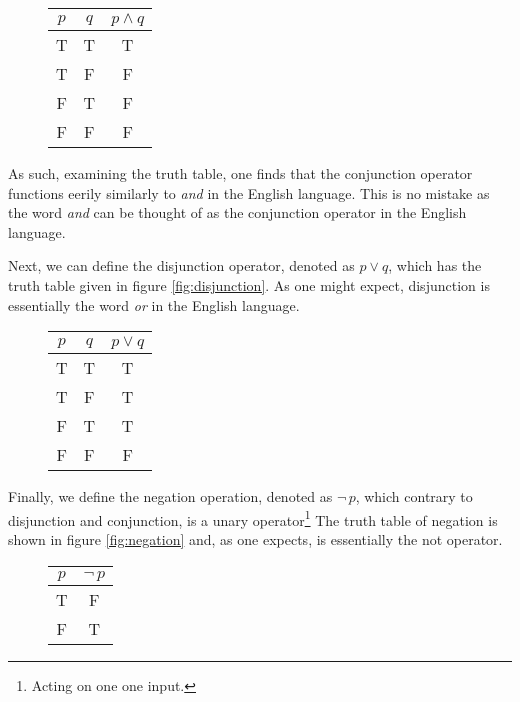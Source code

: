 \begin{figure}[h]
	\centering
	\begin{tabular}{ |c|c|c| }
		\hline
		$p$ & $q$ & $p\wedge q$ \\
		\hline
		T & T & T \\
		\hline
		T & F & F\\
		\hline
			F & T & F\\
		\hline
		F & F & F\\
		\hline
	\end{tabular}
	\caption{}
	\label{fig:conjunction}	
\end{figure}

As such, examining the truth table, one finds that the conjunction operator functions eerily similarly to \textit{and} in the English language.
This is no mistake as the word \textit{and} can be thought of as the conjunction operator in the English language.

Next, we can define the disjunction operator, denoted as $p\vee q$, which has the truth table given in figure \eqref{fig:disjunction}.
As one might expect, disjunction is essentially the word \textit{or} in the English language.

\begin{figure}[h]
	\centering
	\begin{tabular}{ |c|c|c| }
		\hline
		$p$ & $q$ & $p\vee q$ \\
		\hline
		T & T & T \\
		\hline
		T & F & T\\
		\hline
		F & T & T\\
		\hline
		F & F & F\\
		\hline
	\end{tabular}
	\caption{}
	\label{fig:disjunction}	
\end{figure}

Finally, we define the negation operation, denoted as $\neg \, p$, which contrary to disjunction and conjunction, is a unary operator\footnote{
Acting on one one input.}
The truth table of negation is shown in figure \eqref{fig:negation} and, as one expects, is essentially the not operator.

\begin{figure}[h]
	\centering
	\begin{tabular}{ |c|c| }
		\hline
		$p$  & $\neg \, p$ \\
		\hline
		T & F \\
		\hline
		F & T \\
		\hline
	\end{tabular}
	\caption{}
	\label{fig:negation}	
\end{figure}


